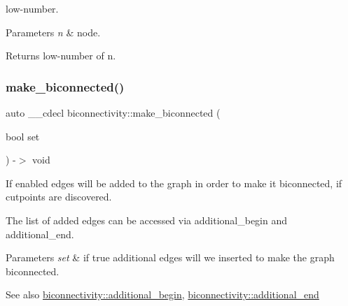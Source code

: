 low-\/number. 


\begin{DoxyParams}{Parameters}
{\em n} & node. \\
\hline
\end{DoxyParams}
\begin{DoxyReturn}{Returns}
low-\/number of n. 
\end{DoxyReturn}
\mbox{\label{classbiconnectivity_a58014d7166628862c2bb064624b9a888}} 
\subsubsection{\texorpdfstring{make\+\_\+biconnected()}{make\_biconnected()}\hspace{0.1cm}{\footnotesize\ttfamily [1/2]}}
{\footnotesize\ttfamily auto \+\_\+\+\_\+cdecl biconnectivity\+::make\+\_\+biconnected (\begin{DoxyParamCaption}\item[{bool}]{set }\end{DoxyParamCaption}) -\/$>$ void
	\hspace{0.3cm}{\ttfamily [inline]}}



If enabled edges will be added to the graph in order to make it biconnected, if cutpoints are discovered. 

The list of added edges can be accessed via additional\+\_\+begin and additional\+\_\+end.


\begin{DoxyParams}{Parameters}
{\em set} & if true additional edges will we inserted to make the graph biconnected. \\
\hline
\end{DoxyParams}
\begin{DoxySeeAlso}{See also}
\mbox{\hyperlink{classbiconnectivity_a896398c41cf0c84714b4cc7475aafc6e}{biconnectivity\+::additional\+\_\+begin}}, \mbox{\hyperlink{classbiconnectivity_a8efa922c941f73613a3083fbd3e9b5df}{biconnectivity\+::additional\+\_\+end}} 
\end{DoxySeeAlso}
\mbox{\label{classbiconnectivity_afc9429b42767ea006ed2bf7f9bee35ff}} 
